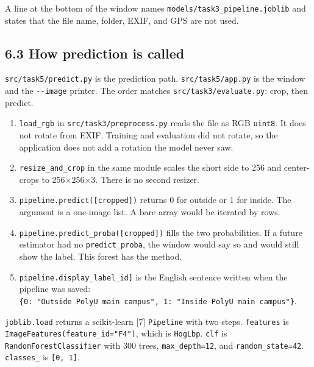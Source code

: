\documentclass[11pt,a4paper]{article}
\providecommand{\tightlist}{%
  \setlength{\itemsep}{0pt}\setlength{\parskip}{0pt}}
\begin{document}
A line at the bottom of the window names \texttt{models/\allowbreak{}task3\_\allowbreak{}pipeline.joblib} and states that the file name, folder, EXIF, and GPS are not used.

\subsection{6.3 How prediction is called}\label{how-prediction-is-called}

\texttt{src/\allowbreak{}task5/\allowbreak{}predict.py} is the prediction path. \texttt{src/\allowbreak{}task5/\allowbreak{}app.py} is the window and the \texttt{-\allowbreak{}\/\allowbreak{}-\allowbreak{}image} printer. The order matches \texttt{src/\allowbreak{}task3/\allowbreak{}evaluate.py}: crop, then predict.

\begin{enumerate}
\def\labelenumi{\arabic{enumi}.}
\tightlist
\item
  \texttt{load\_\allowbreak{}rgb} in \texttt{src/\allowbreak{}task3/\allowbreak{}preprocess.py} reads the file as RGB \texttt{uint8}. It does not rotate from EXIF. Training and evaluation did not rotate, so the application does not add a rotation the model never saw.
\item
  \texttt{resize\_\allowbreak{}and\_\allowbreak{}crop} in the same module scales the short side to 256 and center-crops to 256×256×3. There is no second resizer.
\item
  \texttt{pipeline.predict({[}cropped{]})} returns 0 for outside or 1 for inside. The argument is a one-image list. A bare array would be iterated by rows.
\item
  \texttt{pipeline.predict\_\allowbreak{}proba({[}cropped{]})} fills the two probabilities. If a future estimator had no \texttt{predict\_\allowbreak{}proba}, the window would say so and would still show the label. This forest has the method.
\item
  \texttt{pipeline.display\_\allowbreak{}{[}label\_\allowbreak{}id{]}} is the English sentence written when the pipeline was saved: \texttt{\{0:\ "Outside\ PolyU\ main\ campus",\ 1:\ "Inside\ PolyU\ main\ campus"\}}.
\end{enumerate}

\texttt{joblib.load} returns a scikit-learn {[}7{]} \texttt{Pipeline} with two steps. \texttt{features} is \texttt{ImageFeatures(feature\_\allowbreak{}id="F4")}, which is \texttt{HogLbp}. \texttt{clf} is \texttt{RandomForestClassifier} with 300 trees, \texttt{max\_\allowbreak{}depth=12}, and \texttt{random\_\allowbreak{}state=42}. \texttt{classes\_\allowbreak{}} is \texttt{{[}0,\ 1{]}}.
\end{document}
